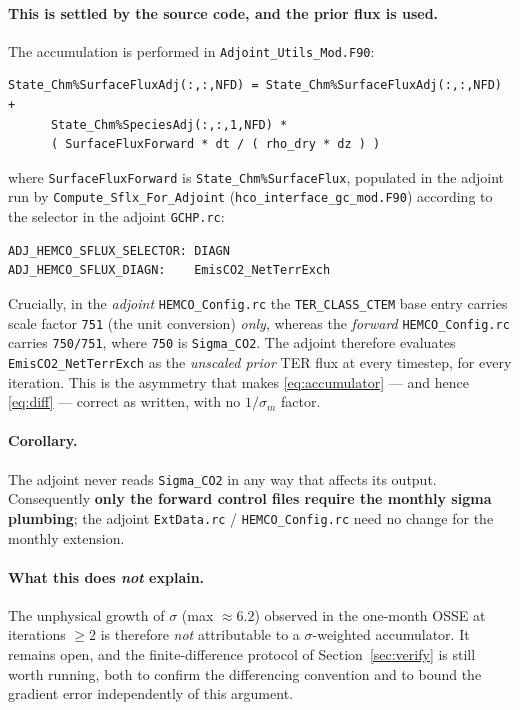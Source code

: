 \documentclass[12pt]{article}
\begin{document}
\paragraph{This is settled by the source code, and the prior flux is used.} The
accumulation is performed in \texttt{Adjoint\_Utils\_Mod.F90}:
%
\begin{verbatim}
State_Chm%SurfaceFluxAdj(:,:,NFD) = State_Chm%SurfaceFluxAdj(:,:,NFD) +
      State_Chm%SpeciesAdj(:,:,1,NFD) *
      ( SurfaceFluxForward * dt / ( rho_dry * dz ) )
\end{verbatim}
%
where \texttt{SurfaceFluxForward} is \texttt{State\_Chm\%SurfaceFlux}, populated in the
adjoint run by \texttt{Compute\_Sflx\_For\_Adjoint} (\texttt{hco\_interface\_gc\_mod.F90})
according to the selector in the adjoint \texttt{GCHP.rc}:
%
\begin{verbatim}
ADJ_HEMCO_SFLUX_SELECTOR: DIAGN
ADJ_HEMCO_SFLUX_DIAGN:    EmisCO2_NetTerrExch
\end{verbatim}
%
Crucially, in the \emph{adjoint} \texttt{HEMCO\_Config.rc} the \texttt{TER\_CLASS\_CTEM}
base entry carries scale factor \texttt{751} (the unit conversion) \emph{only}, whereas
the \emph{forward} \texttt{HEMCO\_Config.rc} carries \texttt{750/751}, where \texttt{750}
is \texttt{Sigma\_CO2}. The adjoint therefore evaluates \texttt{EmisCO2\_NetTerrExch}
as the \emph{unscaled prior} TER flux at every timestep, for every iteration. This is
the asymmetry that makes \eqref{eq:accumulator} --- and hence \eqref{eq:diff} --- correct
as written, with no $1/\sigma_m$ factor.

\paragraph{Corollary.} The adjoint never reads \texttt{Sigma\_CO2} in any way that
affects its output. Consequently \textbf{only the forward control files require the
monthly sigma plumbing}; the adjoint \texttt{ExtData.rc} / \texttt{HEMCO\_Config.rc}
need no change for the monthly extension.

\paragraph{What this does \emph{not} explain.} The unphysical growth of $\sigma$
(max $\approx 6.2$) observed in the one-month OSSE at iterations $\ge 2$ is therefore
\emph{not} attributable to a $\sigma$-weighted accumulator. It remains open, and the
finite-difference protocol of Section~\ref{sec:verify} is still worth running, both to
confirm the differencing convention and to bound the gradient error independently of
this argument.
\end{document}
